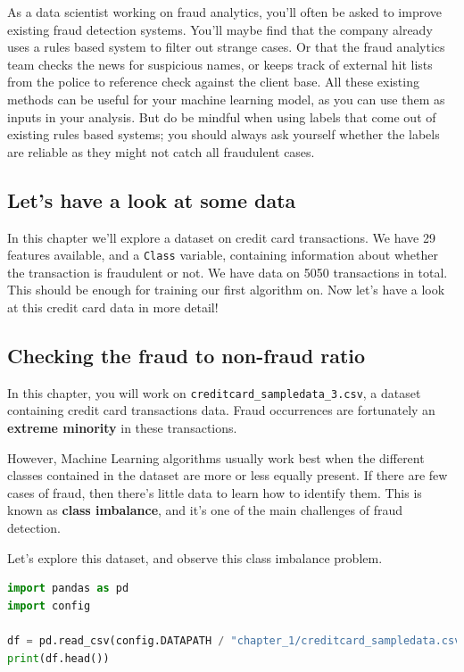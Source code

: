 As a data scientist working on fraud analytics, you'll often be asked to improve existing fraud detection systems. You'll maybe find that the company already uses a rules based system to filter out strange cases. Or that the fraud analytics team checks the news for suspicious names, or keeps track of external hit lists from the police to reference check against the client base. All these existing methods can be useful for your machine learning model, as you can use them as inputs in your analysis. But do be mindful when using labels that come out of existing rules based systems; you should always ask yourself whether the labels are reliable as they might not catch all fraudulent cases.

\subsection{Let's have a look at some data}
In this chapter we'll explore a dataset on credit card transactions. We have 29 features available, and a \lstinline!Class! variable, containing information about whether the transaction is fraudulent or not. We have data on 5050 transactions in total. This should be enough for training our first algorithm on. Now let's have a look at this credit card data in more detail!

\subsection{Checking the fraud to non-fraud ratio}
In this chapter, you will work on \lstinline!creditcard_sampledata_3.csv!, a dataset containing credit card transactions data. Fraud occurrences are fortunately an \textbf{extreme minority} in these transactions.

However, Machine Learning algorithms usually work best when the different classes contained in the dataset are more or less equally present. If there are few cases of fraud, then there's little data to learn how to identify them. This is known as \textbf{class imbalance}, and it's one of the main challenges of fraud detection.

Let's explore this dataset, and observe this class imbalance problem.

\begin{lstlisting}[language={python}]
import pandas as pd
import config

df = pd.read_csv(config.DATAPATH / "chapter_1/creditcard_sampledata.csv")
print(df.head())
\end{lstlisting}

